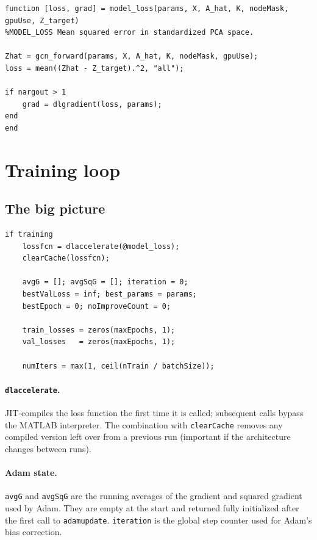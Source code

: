 \documentclass[11pt]{article}
\begin{document}
\begin{lstlisting}[caption={\texttt{helpers/model\_loss.m}}]
function [loss, grad] = model_loss(params, X, A_hat, K, nodeMask, gpuUse, Z_target)
%MODEL_LOSS Mean squared error in standardized PCA space.

Zhat = gcn_forward(params, X, A_hat, K, nodeMask, gpuUse);
loss = mean((Zhat - Z_target).^2, "all");

if nargout > 1
    grad = dlgradient(loss, params);
end
end
\end{lstlisting}

\section{Training loop}

\subsection{The big picture}

\begin{lstlisting}[caption={Training setup (\texttt{Main.m})}]
if training
    lossfcn = dlaccelerate(@model_loss);
    clearCache(lossfcn);

    avgG = []; avgSqG = []; iteration = 0;
    bestValLoss = inf; best_params = params;
    bestEpoch = 0; noImproveCount = 0;

    train_losses = zeros(maxEpochs, 1);
    val_losses   = zeros(maxEpochs, 1);

    numIters = max(1, ceil(nTrain / batchSize));
\end{lstlisting}

\paragraph{\texttt{dlaccelerate}.} JIT-compiles the loss function the first
time it is called; subsequent calls bypass the MATLAB interpreter. The
combination with \texttt{clearCache} removes any compiled version left over
from a previous run (important if the architecture changes between runs).

\paragraph{Adam state.} \texttt{avgG} and \texttt{avgSqG} are the running
averages of the gradient and squared gradient used by Adam. They are empty
at the start and returned fully initialized after the first call to
\texttt{adamupdate}. \texttt{iteration} is the global step counter used for
Adam's bias correction.
\end{document}
